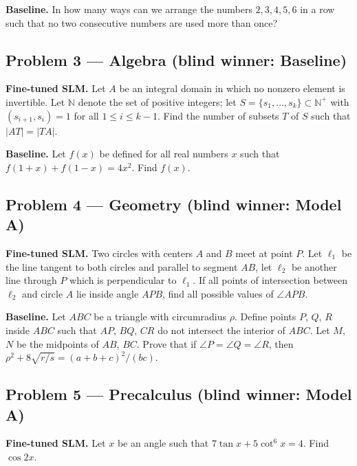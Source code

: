 \documentclass[11pt]{article}
\begin{document}
\medskip

\textbf{Baseline.} In how many ways can we arrange the numbers $2, 3, 4, 5, 6$ in a row such that no two consecutive numbers are used more than once?

\subsection*{Problem 3 --- Algebra \quad (blind winner: Baseline)}

\textbf{Fine-tuned SLM.} Let $A$ be an integral domain in which no nonzero element is invertible. Let $\mathbb{N}$ denote the set of positive integers; let $S=\{s_1,\ldots,s_k\}\subset \mathbb N^{+}$ with $(s_{i+1}, s_i)=1$ for all $1\leq i\leq k-1$. Find the number of subsets $T$ of $S$ such that $|AT|=|TA|$.

\medskip

\textbf{Baseline.} Let $f(x)$ be defined for all real numbers $x$ such that $f(1+x) + f(1-x) = 4x^2$. Find $f(x)$.

\subsection*{Problem 4 --- Geometry \quad (blind winner: Model A)}

\textbf{Fine-tuned SLM.} Two circles with centers $A$ and $B$ meet at point $P$. Let $\ell_1$ be the line tangent to both circles and parallel to segment $AB$, let $\ell_2$ be another line through $P$ which is perpendicular to $\ell_1$. If all points of intersection between $\ell_2$ and circle $A$ lie inside angle $APB$, find all possible values of $\angle APB$.

\medskip

\textbf{Baseline.} Let $ABC$ be a triangle with circumradius $\rho$. Define points $P$, $Q$, $R$ inside $ABC$ such that $AP$, $BQ$, $CR$ do not intersect the interior of $ABC$. Let $M$, $N$ be the midpoints of $AB$, $BC$. Prove that if $\angle P = \angle Q = \angle R$, then $\rho^2 + 8\sqrt{r/s} = (a+b+c)^2/(bc)$.

\subsection*{Problem 5 --- Precalculus \quad (blind winner: Model A)}

\textbf{Fine-tuned SLM.} Let $x$ be an angle such that $7 \tan x + 5 \cot^6 x = 4$. Find $\cos 2x$.

\medskip
\end{document}

